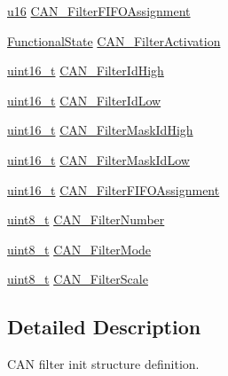 \begin{DoxyCompactItemize}
\item 
\hyperlink{agilefox_2library_2inc_2stm32f10x__type_8h_a9e6c91d77e24643b888dbd1a1a590054}{u16} \hyperlink{struct_c_a_n___filter_init_type_def_aa7da4664b11680b76d7af06d3fa78f14}{C\+A\+N\+\_\+\+Filter\+F\+I\+F\+O\+Assignment}
\item 
\hyperlink{agilefox_2library_2inc_2stm32f10x__type_8h_ac9a7e9a35d2513ec15c3b537aaa4fba1}{Functional\+State} \hyperlink{struct_c_a_n___filter_init_type_def_a0225afda33b565f358ca75bdaa780074}{C\+A\+N\+\_\+\+Filter\+Activation}
\item 
\hyperlink{_p_e___types_8h_a1f1825b69244eb3ad2c7165ddc99c956}{uint16\+\_\+t} \hyperlink{struct_c_a_n___filter_init_type_def_afc109aa8eedced09d296605f2eb871f7}{C\+A\+N\+\_\+\+Filter\+Id\+High}
\item 
\hyperlink{_p_e___types_8h_a1f1825b69244eb3ad2c7165ddc99c956}{uint16\+\_\+t} \hyperlink{struct_c_a_n___filter_init_type_def_ab8c56b48ac323e8c7a1b535c79a51f87}{C\+A\+N\+\_\+\+Filter\+Id\+Low}
\item 
\hyperlink{_p_e___types_8h_a1f1825b69244eb3ad2c7165ddc99c956}{uint16\+\_\+t} \hyperlink{struct_c_a_n___filter_init_type_def_a6f34539615e6484f266b46aa8f362a91}{C\+A\+N\+\_\+\+Filter\+Mask\+Id\+High}
\item 
\hyperlink{_p_e___types_8h_a1f1825b69244eb3ad2c7165ddc99c956}{uint16\+\_\+t} \hyperlink{struct_c_a_n___filter_init_type_def_a0f052daf04b0a481ecfa5c2cc8058089}{C\+A\+N\+\_\+\+Filter\+Mask\+Id\+Low}
\item 
\hyperlink{_p_e___types_8h_a1f1825b69244eb3ad2c7165ddc99c956}{uint16\+\_\+t} \hyperlink{struct_c_a_n___filter_init_type_def_a01ba491f12097adcc9f0a3d627628d55}{C\+A\+N\+\_\+\+Filter\+F\+I\+F\+O\+Assignment}
\item 
\hyperlink{_p_e___types_8h_aba7bc1797add20fe3efdf37ced1182c5}{uint8\+\_\+t} \hyperlink{struct_c_a_n___filter_init_type_def_af94466e1138c2b4fe6a67cf556981193}{C\+A\+N\+\_\+\+Filter\+Number}
\item 
\hyperlink{_p_e___types_8h_aba7bc1797add20fe3efdf37ced1182c5}{uint8\+\_\+t} \hyperlink{struct_c_a_n___filter_init_type_def_a7cfb23c48aad13a058c2619dbc062d8a}{C\+A\+N\+\_\+\+Filter\+Mode}
\item 
\hyperlink{_p_e___types_8h_aba7bc1797add20fe3efdf37ced1182c5}{uint8\+\_\+t} \hyperlink{struct_c_a_n___filter_init_type_def_a9d52661aca538dbfcafdda6f16dddc82}{C\+A\+N\+\_\+\+Filter\+Scale}
\end{DoxyCompactItemize}


\subsection{Detailed Description}
C\+AN filter init structure definition. 

